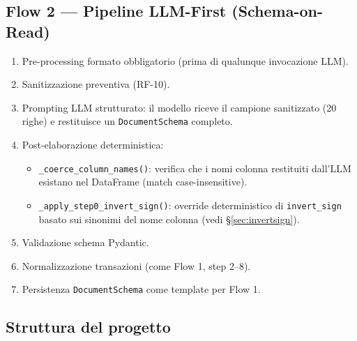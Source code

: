 \documentclass[11pt, a4paper]{article}
\begin{document}
\subsection{Flow 2 --- Pipeline LLM-First (Schema-on-Read)}

\begin{enumerate}[leftmargin=2em]
  \item Pre-processing formato obbligatorio (prima di qualunque invocazione LLM).
  \item Sanitizzazione preventiva (RF-10).
  \item Prompting LLM strutturato: il modello riceve il campione sanitizzato (20 righe)
        e restituisce un \texttt{DocumentSchema} completo.
  \item Post-elaborazione deterministica:
    \begin{itemize}
      \item \texttt{\_coerce\_column\_names()}: verifica che i nomi colonna restituiti
            dall'LLM esistano nel DataFrame (match case-insensitive).
      \item \texttt{\_apply\_step0\_invert\_sign()}: override deterministico di
            \texttt{invert\_sign} basato sui sinonimi del nome colonna
            (vedi §\ref{sec:invertsign}).
    \end{itemize}
  \item Validazione schema Pydantic.
  \item Normalizzazione transazioni (come Flow 1, step 2--8).
  \item Persistenza \texttt{DocumentSchema} come template per Flow 1.
\end{enumerate}

\subsection{Struttura del progetto}
\end{document}
